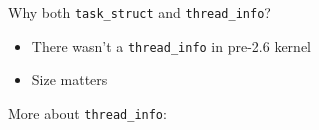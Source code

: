 \begin{frame}
  \begin{center}
  \end{center}
  \begin{block}{Why both \texttt{task\_struct} and \texttt{thread\_info}?}
    \begin{itemize}
    \item There wasn't a \texttt{thread\_info} in pre-2.6 kernel
    \item Size matters
    \end{itemize}
  \end{block}
\end{frame}

More about \texttt{thread\_info}:
